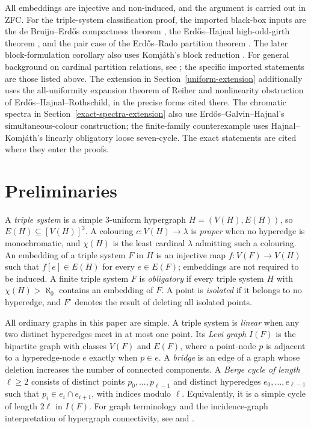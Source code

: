 \documentclass[a4paper,11pt,reqno]{amsart}
\theoremstyle{plain}
\theoremstyle{definition}
\theoremstyle{remark}
\begin{document}
All embeddings are injective and non-induced, and the argument is carried out
in ZFC.  For the triple-system classification proof, the imported black-box inputs are the de Bruijn--Erdős
compactness theorem \citep[Theorem~1, pp.~371--373]{debruijn1951}, the
Erdős--Hajnal high-odd-girth theorem
\citep[Theorem~7.4, p.~76]{erdoshajnal1966}, and the pair case of the
Erdős--Rado partition theorem
\citep[Theorem~4(i), formula~(95), p.~471]{erdosrado1956}.
The later block-formulation corollary also uses Komjáth's block reduction
\citep{komjath2001}.
For general background on cardinal partition relations, see
\citet{ehmr1984}; the specific imported statements are those listed above.  The extension
in Section~\ref{uniform-extension} additionally uses the all-uniformity
expansion theorem of Reiher and nonlinearity obstruction of
Erdős--Hajnal--Rothschild, in the precise forms cited there.  The
chromatic spectra in Section~\ref{exact-spectra-extension} also use
Erdős--Galvin--Hajnal's simultaneous-colour construction; the
finite-family counterexample uses Hajnal--Komjáth's linearly
obligatory loose seven-cycle.  The exact statements are cited where
they enter the proofs.

\section{Preliminaries}\label{conventions-and-definitions}

A \emph{triple system} is a simple \(3\)-uniform hypergraph \(H=(V(H),E(H))\), so \(E(H)\subseteq[V(H)]^3\). A colouring \(c:V(H)\to\lambda\) is \emph{proper} when no hyperedge is monochromatic, and \(\chi(H)\) is the least cardinal \(\lambda\) admitting such a colouring. An embedding of a triple system \(F\) in \(H\) is an injective map \(f:V(F)\to V(H)\) such that \(f[e]\in E(H)\) for every \(e\in E(F)\); embeddings are not required to be induced. A finite triple system \(F\) is \emph{obligatory} if every triple system \(H\) with \(\chi(H)>\aleph_0\) contains an embedding of \(F\). A point is \emph{isolated} if it belongs to no hyperedge, and \(F^\circ\) denotes the result of deleting all isolated points.

All ordinary graphs in this paper are simple. A triple system is \emph{linear} when any two distinct hyperedges meet in at most one point. Its \emph{Levi graph} \(I(F)\) is the bipartite graph with classes \(V(F)\) and \(E(F)\), where a point-node \(p\) is adjacent to a hyperedge-node \(e\) exactly when \(p\in e\). A \emph{bridge} is an edge of a graph whose deletion increases the number of connected components. A \emph{Berge cycle of length} \(\ell\ge2\) consists of distinct points \(p_0,\ldots,p_{\ell-1}\) and distinct hyperedges \(e_0,\ldots,e_{\ell-1}\) such that \(p_i\in e_i\cap e_{i+1}\), with indices modulo \(\ell\). Equivalently, it is a simple cycle of length \(2\ell\) in \(I(F)\). For graph terminology and the incidence-graph interpretation of hypergraph connectivity, see \citet[Chapters~1 and~3]{diestel2017} and \citet{bahmanian2015}.
\end{document}
